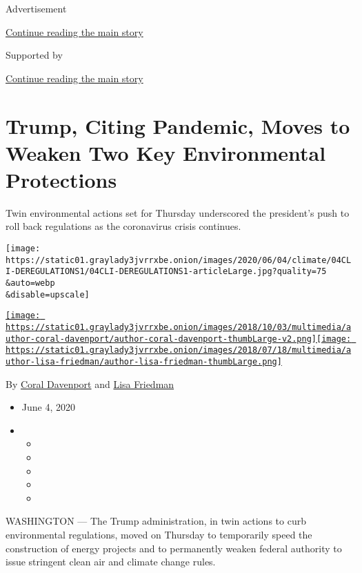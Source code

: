 Advertisement

\protect\hyperlink{after-top}{Continue reading the main story}

Supported by

\protect\hyperlink{after-sponsor}{Continue reading the main story}

\hypertarget{trump-citing-pandemic-moves-to-weaken-two-key-environmental-protections-}{%
\section{Trump, Citing Pandemic, Moves to Weaken Two Key Environmental
Protections
}\label{trump-citing-pandemic-moves-to-weaken-two-key-environmental-protections-}}

Twin environmental actions set for Thursday underscored the president's
push to roll back regulations as the coronavirus crisis continues.

\texttt{[image: https://static01.graylady3jvrrxbe.onion/images/2020/06/04/climate/04CLI-DEREGULATIONS1/04CLI-DEREGULATIONS1-articleLarge.jpg?quality=75\\\&auto=webp\\\&disable=upscale]}

\href{https://www.nytimes3xbfgragh.onion/by/coral-davenport}{\texttt{[image: https://static01.graylady3jvrrxbe.onion/images/2018/10/03/multimedia/author-coral-davenport/author-coral-davenport-thumbLarge-v2.png]}}\href{https://www.nytimes3xbfgragh.onion/by/lisa-friedman}{\texttt{[image: https://static01.graylady3jvrrxbe.onion/images/2018/07/18/multimedia/author-lisa-friedman/author-lisa-friedman-thumbLarge.png]}}

By \href{https://www.nytimes3xbfgragh.onion/by/coral-davenport}{Coral
Davenport} and
\href{https://www.nytimes3xbfgragh.onion/by/lisa-friedman}{Lisa
Friedman}

\begin{itemize}
\item
  June 4, 2020
\item
  \begin{itemize}
  \item
  \item
  \item
  \item
  \item
  \end{itemize}
\end{itemize}

WASHINGTON --- The Trump administration, in twin actions to curb
environmental regulations, moved on Thursday to temporarily speed the
construction of energy projects and to permanently weaken federal
authority to issue stringent clean air and climate change rules.

